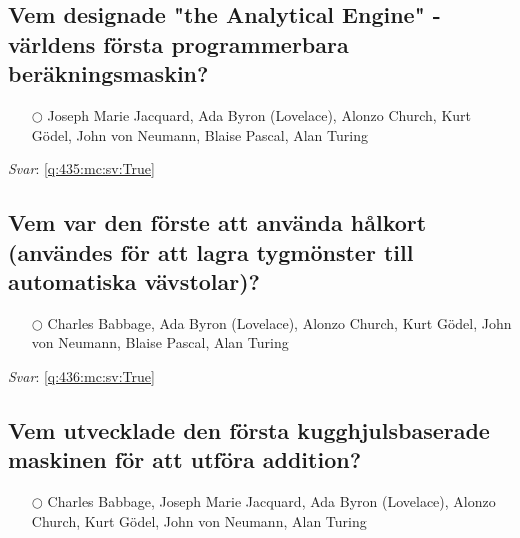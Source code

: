 \documentclass[a4paper,11pt,oneside]{article}
\begin{document}
\begin{sloppypar}
\subsection{Vem designade "the Analytical Engine" - v\"arldens f\"orsta programmerbara ber\"akningsmaskin?}

\label{q:435:mc:sv:False}

\begin{itemize}
  \item[$\bigcirc$] Joseph Marie Jacquard, Ada Byron (Lovelace), Alonzo Church, Kurt G\"odel, John von Neumann, Blaise Pascal, Alan Turing
\end{itemize}

\vspace{1cm}

\textit{Svar}: \autoref{q:435:mc:sv:True}



\subsection{Vem var den f\"orste att anv\"anda h\r{a}lkort (anv\"andes f\"or att lagra tygm\"onster till automatiska v\"avstolar)?}

\label{q:436:mc:sv:False}

\begin{itemize}
  \item[$\bigcirc$] Charles Babbage, Ada Byron (Lovelace), Alonzo Church, Kurt G\"odel, John von Neumann, Blaise Pascal, Alan Turing
\end{itemize}

\vspace{1cm}

\textit{Svar}: \autoref{q:436:mc:sv:True}



\subsection{Vem utvecklade den f\"orsta kugghjulsbaserade maskinen f\"or att utf\"ora addition?}

\label{q:437:mc:sv:False}

\begin{itemize}
  \item[$\bigcirc$] Charles Babbage, Joseph Marie Jacquard, Ada Byron (Lovelace), Alonzo Church, Kurt G\"odel, John von Neumann, Alan Turing
\end{itemize}

\vspace{1cm}


\end{sloppypar}
\end{document}
